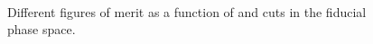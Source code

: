 \begin{figure}[htb]
\centering
{}
\\
\caption{Different figures of merit as a function of \MET and \mt cuts in the fiducial phase space.}\label{fig:fig_merit_nom}
\end{figure}


